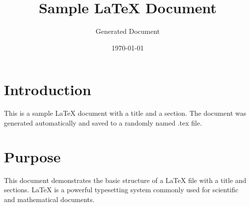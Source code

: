 \documentclass{article}
\title{Sample LaTeX Document}
\author{Generated Document}
\date{\today}
\begin{document}
\maketitle

\section{Introduction}
This is a sample LaTeX document with a title and a section. The document was generated automatically and saved to a randomly named .tex file.

\section{Purpose}
This document demonstrates the basic structure of a LaTeX file with a title and sections. LaTeX is a powerful typesetting system commonly used for scientific and mathematical documents.
\end{document}
